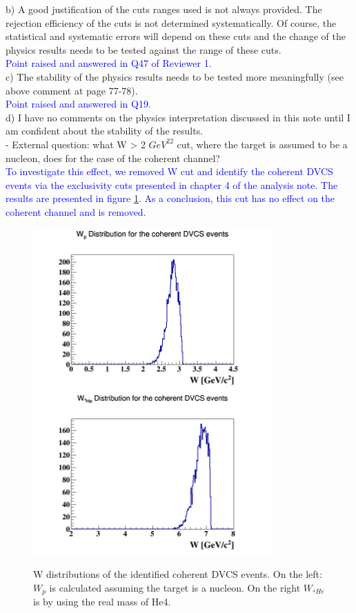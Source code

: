  b) A good justification of the cuts ranges used is not always provided. The 
rejection efficiency of the cuts is not determined systematically. Of course, 
the statistical and systematic errors will depend on these cuts and the change 
of the physics results needs to be tested against the range of these cuts. \\
\textcolor{blue}{ Point raised and answered in Q47 of Reviewer 1. }\\

c) The stability of the physics results needs to be tested more meaningfully 
(see above comment at page 77-78).\\
\textcolor{blue}{ Point raised and answered in Q19.}\\

d) I have no comments on the physics interpretation discussed in this note 
until I am confident about the stability of the results.\\


- External question: what W > 2 $GeV^22$ cut, where the target is assumed to be 
a nucleon, does for the case of the coherent channel?\\
\textcolor{blue}{
To investigate this effect, we removed W cut and identify the coherent DVCS 
events via the exclusivity cuts presented in chapter 4 of the analysis note.  
The results are presented in figure \ref{fig:W_coh_DVCS}. As a conclusion, this 
cut has no effect on the coherent channel and is removed.}\\


\begin{figure}[tbp]
\includegraphics[height=6.2cm]{fig/W_coh_p.png}             
\includegraphics[height=6.2cm]{fig/W_coh_He.png} \caption{W distributions of 
   the identified coherent DVCS events. On the left: $W_p$ is calculated 
   assuming the target is a nucleon. On the right $W_{^4He}$ is by using the 
real mass of He4.}
\label{fig:W_coh_DVCS}
\end{figure}



